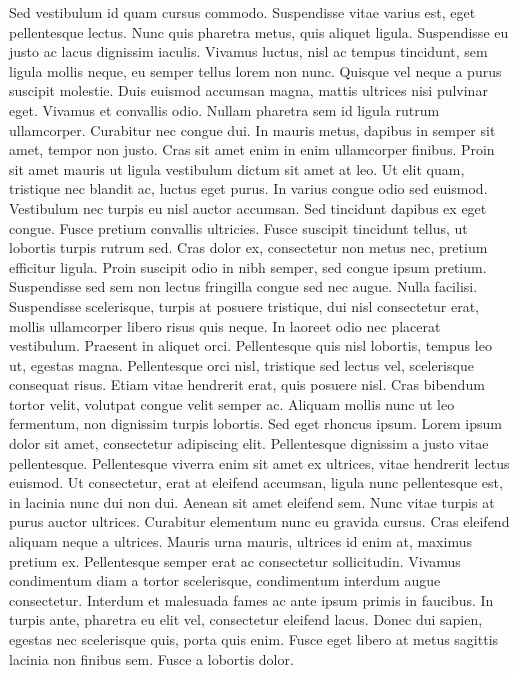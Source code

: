\documentclass{article}
\begin{document}
Sed vestibulum id quam cursus commodo. Suspendisse vitae varius est, eget pellentesque lectus. Nunc quis pharetra metus, quis aliquet ligula. Suspendisse eu justo ac lacus dignissim iaculis. Vivamus luctus, nisl ac tempus tincidunt, sem ligula mollis neque, eu semper tellus lorem non nunc. Quisque vel neque a purus suscipit molestie. Duis euismod accumsan magna, mattis ultrices nisi pulvinar eget. Vivamus et convallis odio. Nullam pharetra sem id ligula rutrum ullamcorper. Curabitur nec congue dui. In mauris metus, dapibus in semper sit amet, tempor non justo. Cras sit amet enim in enim ullamcorper finibus. Proin sit amet mauris ut ligula vestibulum dictum sit amet at leo. Ut elit quam, tristique nec blandit ac, luctus eget purus. In varius congue odio sed euismod. Vestibulum nec turpis eu nisl auctor accumsan.
Sed tincidunt dapibus ex eget congue. Fusce pretium convallis ultricies. Fusce suscipit tincidunt tellus, ut lobortis turpis rutrum sed. Cras dolor ex, consectetur non metus nec, pretium efficitur ligula. Proin suscipit odio in nibh semper, sed congue ipsum pretium. Suspendisse sed sem non lectus fringilla congue sed nec augue. Nulla facilisi. Suspendisse scelerisque, turpis at posuere tristique, dui nisl consectetur erat, mollis ullamcorper libero risus quis neque. In laoreet odio nec placerat vestibulum. Praesent in aliquet orci. Pellentesque quis nisl lobortis, tempus leo ut, egestas magna. Pellentesque orci nisl, tristique sed lectus vel, scelerisque consequat risus. Etiam vitae hendrerit erat, quis posuere nisl. Cras bibendum tortor velit, volutpat congue velit semper ac. Aliquam mollis nunc ut leo fermentum, non dignissim turpis lobortis. Sed eget rhoncus ipsum.
Lorem ipsum dolor sit amet, consectetur adipiscing elit. Pellentesque dignissim a justo vitae pellentesque. Pellentesque viverra enim sit amet ex ultrices, vitae hendrerit lectus euismod. Ut consectetur, erat at eleifend accumsan, ligula nunc pellentesque est, in lacinia nunc dui non dui. Aenean sit amet eleifend sem. Nunc vitae turpis at purus auctor ultrices. Curabitur elementum nunc eu gravida cursus. Cras eleifend aliquam neque a ultrices. Mauris urna mauris, ultrices id enim at, maximus pretium ex. Pellentesque semper erat ac consectetur sollicitudin. Vivamus condimentum diam a tortor scelerisque, condimentum interdum augue consectetur. Interdum et malesuada fames ac ante ipsum primis in faucibus. In turpis ante, pharetra eu elit vel, consectetur eleifend lacus. Donec dui sapien, egestas nec scelerisque quis, porta quis enim. Fusce eget libero at metus sagittis lacinia non finibus sem. Fusce a lobortis dolor.
\end{document}
